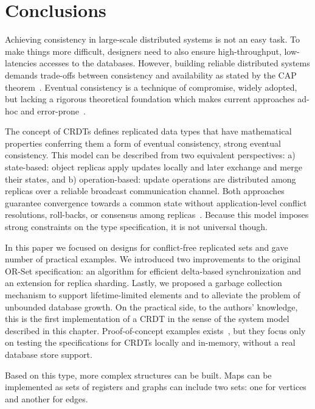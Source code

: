 \section{Conclusions}
\label{sec:conclusions}

Achieving consistency in large-scale distributed systems is not an easy task. To
make things more difficult, designers need to also ensure high-throughput,
low-latencies accesses to the databases. However, building reliable distributed
systems demands trade-offs between consistency and availability as stated by the
CAP theorem~\cite{Gilbert:2002:BCF:564585.564601}. Eventual consistency is a
technique of compromise, widely adopted, but lacking a rigorous theoretical
foundation which makes current approaches ad-hoc and
error-prone~\cite{DeCandia:2007:DAH:1294261.1294281}.

The concept of CRDTs defines replicated data types that have mathematical
properties conferring them a form of eventual consistency, strong eventual
consistency. This model can be described from two equivalent perspectives:
a) state-based: object replicas apply updates locally and later exchange and
merge their states, and b) operation-based: update operations are distributed
among replicas over a reliable broadcast communication channel. Both approaches
guarantee convergence towards a common state without application-level conflict
resolutions, roll-backs, or consensus among
replicas~\cite{Terry:1995:MUC:224056.224070}. Because this model imposes strong
constraints on the type specification, it is not universal though.

In this paper we focused on designs for conflict-free replicated sets and gave
number of practical examples. We introduced two improvements to the original
OR-Set specification: an algorithm for efficient delta-based synchronization and
an extension for replica sharding. Lastly, we proposed a garbage collection
mechanism to support lifetime-limited elements and to alleviate the problem of
unbounded database growth. On the practical side, to the authors' knowledge,
this is the first implementation of a CRDT in the sense of the system model
described in this chapter. Proof-of-concept examples exists~\cite{ericmoritz,
dominictarr}, but they focus only on testing the specifications for CRDTs
locally and in-memory, without a real database store support.

Based on this type, more complex structures can be built. Maps can be
implemented as sets of registers and graphs can include two sets: one for
vertices and another for edges.
